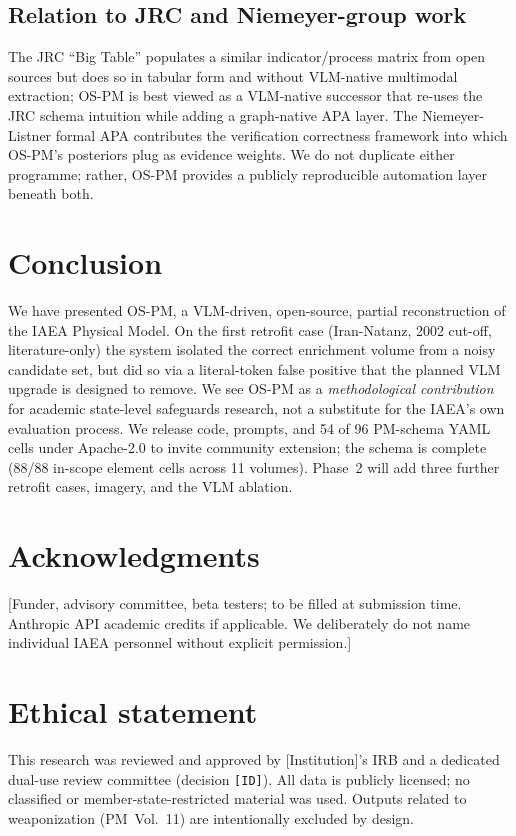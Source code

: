\documentclass[11pt,a4paper]{article}
\begin{document}
\subsection{Relation to JRC and Niemeyer-group work}
The JRC ``Big Table'' \cite{Renda2014,Renda2015} populates a similar
indicator/process matrix from open sources but does so in tabular
form and without VLM-native multimodal extraction; OS-PM is best
viewed as a VLM-native successor that re-uses the JRC schema
intuition while adding a graph-native APA layer. The Niemeyer-Listner
formal APA \cite{Listner2013,Allen2021} contributes the verification
correctness framework into which OS-PM's posteriors plug as evidence
weights. We do not duplicate either programme; rather, OS-PM provides
a publicly reproducible automation layer beneath both.

\section{Conclusion}
We have presented OS-PM, a VLM-driven, open-source, partial
reconstruction of the IAEA Physical Model. On the first retrofit case
(Iran-Natanz, 2002 cut-off, literature-only) the system isolated the
correct enrichment volume from a noisy candidate set, but did so via
a literal-token false positive that the planned VLM upgrade is
designed to remove. We see OS-PM as a \emph{methodological
contribution} for academic state-level safeguards research, not a
substitute for the IAEA's own evaluation process. We release code,
prompts, and 54 of 96 PM-schema YAML cells under Apache-2.0 to invite
community extension; the schema is complete (88/88 in-scope element
cells across 11 volumes). Phase~2 will add three further retrofit
cases, imagery, and the VLM ablation.

\section*{Acknowledgments}
[Funder, advisory committee, beta testers; to be filled at submission
time. Anthropic API academic credits if applicable. We deliberately do
not name individual IAEA personnel without explicit permission.]

\section*{Ethical statement}
This research was reviewed and approved by [Institution]'s IRB and a
dedicated dual-use review committee (decision \texttt{[ID]}). All data
is publicly licensed; no classified or member-state-restricted material
was used. Outputs related to weaponization (PM~Vol.~11) are intentionally
excluded by design.
\end{document}
